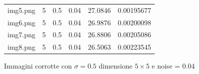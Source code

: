 \begin{figure}[H]
\begin{minipage}[h]{0.55\textwidth}
{\begin{tabular}{|l c c c c r|}
                img5.png & 5 & 0.5 & 0.04 & 27.0846 & 0.00195677 \\
                img6.png & 5 & 0.5 & 0.04 & 26.9876 & 0.00200098 \\
                img7.png & 5 & 0.5 & 0.04 & 26.8806 & 0.00205086 \\
                img8.png & 5 & 0.5 & 0.04 & 26.5063 & 0.00223545 \\ \hline
            \end{tabular}\label{tab:tabcorrotte2}%
        }   
        \end{minipage}%
    \begin{minipage}[h]{0.4\textwidth}
        \centering
    \end{minipage}
    \captionsetup{labelformat=andtable}
    \caption{Immagini corrotte con $\sigma = 0.5$ dimensione $5 \times 5$ e noise = 0.04}
\end{figure}

